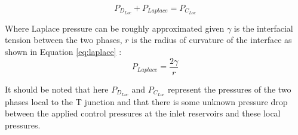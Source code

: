 \begin{equation}
P_{D_{Loc}} + P_{Laplace} = P_{C_{Loc}} 
\label{eq:noflow}
\end{equation}

Where Laplace pressure can be roughly approximated given $\gamma$ is the interfacial tension between the two phases, $r$ is the radius of curvature of the interface as shown in Equation \vref{eq:laplace} \cite{Bruus2008}:
\begin{equation}
 P_{Laplace} = \frac{2 \gamma}{r}
\label{eq:laplace}
\end{equation}

It should be noted that here $P_{D_{Loc}}$ and $P_{C_{Loc}}$ represent the pressures of the two phases local to the T junction and that there is some unknown pressure drop between the applied control pressures at the inlet reservoirs and these local pressures. 

